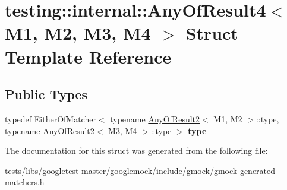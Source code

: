 \hypertarget{structtesting_1_1internal_1_1AnyOfResult4}{}\section{testing\+:\+:internal\+:\+:Any\+Of\+Result4$<$ M1, M2, M3, M4 $>$ Struct Template Reference}
\label{structtesting_1_1internal_1_1AnyOfResult4}
\subsection*{Public Types}
\begin{DoxyCompactItemize}
\item 
\mbox{\label{structtesting_1_1internal_1_1AnyOfResult4_a4f3c9aebb4f7fc24287b59a0bdf1a4a6}} 
typedef Either\+Of\+Matcher$<$ typename \hyperlink{structtesting_1_1internal_1_1AnyOfResult2}{Any\+Of\+Result2}$<$ M1, M2 $>$\+::type, typename \hyperlink{structtesting_1_1internal_1_1AnyOfResult2}{Any\+Of\+Result2}$<$ M3, M4 $>$\+::type $>$ {\bfseries type}
\end{DoxyCompactItemize}


The documentation for this struct was generated from the following file\+:\begin{DoxyCompactItemize}
\item 
tests/libs/googletest-\/master/googlemock/include/gmock/gmock-\/generated-\/matchers.\+h\end{DoxyCompactItemize}
